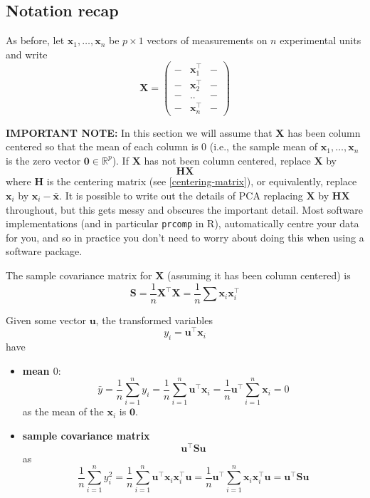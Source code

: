 \documentclass[
]{book}
\theoremstyle{definition}
\theoremstyle{definition}
\theoremstyle{definition}
\theoremstyle{definition}
\theoremstyle{remark}
\begin{document}
\subsection{Notation recap}\label{notation-recap}

As before, let \(\mathbf x_1,\ldots,\mathbf x_n\) be \(p \times 1\) vectors of measurements on \(n\) experimental units and write
\[\mathbf X=\left( \begin{array}{ccc}
- &\mathbf x_1^\top&-\\
- &\mathbf x_2^\top&-\\
- &..&-\\
- &\mathbf x_n^\top&-
\end{array}\right)
\]

\textbf{IMPORTANT NOTE:}
In this section we will assume that \(\mathbf X\) has been column centered so that the mean of each column is \(0\) (i.e., the sample mean of \(\mathbf x_1,\ldots,\mathbf x_n\) is the zero vector \({\boldsymbol 0}\in \mathbb{R}^p\)). If \(\mathbf X\) has not been column centered, replace \(\mathbf X\) by
\[\mathbf H\mathbf X\] where \(\mathbf H\) is the centering matrix (see \ref{centering-matrix}), or equivalently, replace \(\mathbf x_i\) by \(\mathbf x_i - \bar{\mathbf x}\). It is possible to write out the details of PCA replacing \(\mathbf X\) by \(\mathbf H\mathbf X\) throughout, but this gets messy and obscures the important detail. Most software implementations (and in particular \texttt{prcomp} in R), automatically centre your data for you, and so in practice you don't need to worry about doing this when using a software package.

The sample covariance matrix for \(\mathbf X\) (assuming it has been column centered) is
\[\mathbf S= \frac{1}{n}\mathbf X^\top \mathbf X= \frac{1}{n}\sum \mathbf x_i\mathbf x_i^\top\]

Given some vector \(\mathbf u\), the transformed variables
\[y_i = \mathbf u^\top \mathbf x_i\]
have

\begin{itemize}
\item
  \textbf{mean \(0\)}:
  \[\bar{y}= \frac{1}{n}\sum_{i=1}^n y_i = \frac{1}{n}\sum_{i=1}^n \mathbf u^\top \mathbf x_i =\frac{1}{n} \mathbf u^\top \sum_{i=1}^n  \mathbf x_i = 0\]
  as the mean of the \(\mathbf x_i\) is \({\boldsymbol 0}\).
\item
  \textbf{sample covariance matrix} \[\mathbf u^\top \mathbf S\mathbf u\]
  as
  \[\frac{1}{n} \sum_{i=1}^n y_i^2 = \frac{1}{n} \sum_{i=1}^n \mathbf u^\top \mathbf x_i \mathbf x_i^\top\mathbf u= \frac{1}{n}\mathbf u^\top \sum_{i=1}^n  \mathbf x_i \mathbf x_i^\top \mathbf u= \mathbf u^\top \mathbf S\mathbf u
  \]
\end{itemize}
\end{document}
